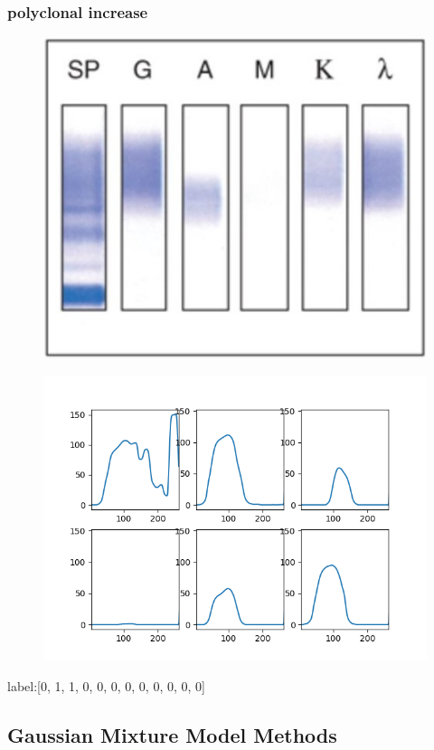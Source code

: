 \documentclass[12pt]{ctexart}
\begin{document}
\subsubsection{polyclonal increase}
\begin{figure}[H]
    \centering
    \includegraphics[width=0.5\linewidth]{pr.jpg}
\end{figure}
\begin{figure}[H]
    \centering
    \includegraphics[width=0.5\linewidth]{polyclonal-increase.png}
\end{figure}
label:[0, 1, 1, 0, 0, 0, 0, 0, 0, 0, 0, 0]
\subsection{Gaussian Mixture Model Methods}
\end{document}
